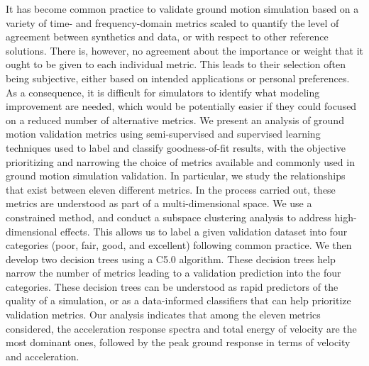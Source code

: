 % 
It has become common practice to validate ground motion simulation based on a variety of time- and frequency-domain metrics scaled to quantify the level of agreement between synthetics and data, or with respect to other reference solutions. There is, however, no agreement about the importance or weight that it ought to be given to each individual metric. This leads to their selection often being subjective, either based on intended applications or personal preferences. As a consequence, it is difficult for simulators to identify what modeling improvement are needed, which would be potentially easier if they could focused on a reduced number of alternative metrics. We present an analysis of ground motion validation metrics using semi-supervised and supervised learning techniques used to label and classify goodness-of-fit results, with the objective prioritizing and narrowing the choice of metrics available and commonly used in ground motion simulation validation. In particular, we study the relationships that exist between eleven different metrics. In the process carried out, these metrics are understood as part of a multi-dimensional space. We use a constrained \kmeans{} method, and conduct a subspace clustering analysis to address high-dimensional effects. This allows us to label a given validation dataset into four categories (poor, fair, good, and excellent) following common practice. We then develop two decision trees using a C5.0 algorithm. These decision trees help narrow the number of metrics leading to a validation prediction into the four categories. These decision trees can be understood as rapid predictors of the quality of a simulation, or as a data-informed classifiers that can help prioritize validation metrics. Our analysis indicates that among the eleven metrics considered, the acceleration response spectra and total energy of velocity are the most dominant ones, followed by the peak ground response in terms of velocity and acceleration.
